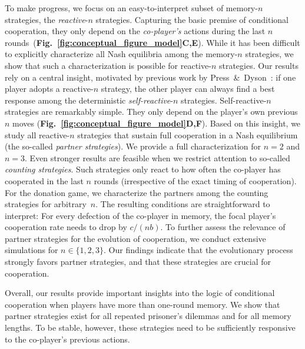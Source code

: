 \documentclass[9pt,twocolumn,twoside]{pnas-new}
\newcommand{\figref}[1]{{\textbf{Fig.~\ref{#1}}}}
\begin{document}
To make progress, we focus on an easy-to-interpret subset of memory-$n$ strategies, the {\it reactive}-$n$ strategies. 
Capturing the basic premise of conditional cooperation, they only depend on the {\it co-player's} actions during the last $n$ rounds~(\figref{fig:conceptual_figure_model}\textbf{C,E}). 
While it has been difficult to explicitly characterize all Nash equilibria among the memory-$n$ strategies, we show that such a characterization is possible for reactive-$n$ strategies. 
Our results rely on a central insight, motivated by previous work by Press~\&~Dyson~\citep{press:PNAS:2012}: 
if one player adopts a reactive-$n$ strategy, the other player can always find a best response among the deterministic {\it self-reactive}-$n$ strategies. 
Self-reactive-$n$ strategies are remarkably simple. 
They only depend on the player's own previous $n$ moves (\figref{fig:conceptual_figure_model}\textbf{D,F}).
Based on this insight, we study all reactive-$n$ strategies that sustain full cooperation in a Nash equilibrium (the so-called {\it partner strategies}). 
We provide a full characterization for $n\!=\!2$ and $n\!=\!3$.
Even stronger results are feasible when we restrict attention to so-called {\it counting strategies}.  
Such strategies only react to how often the co-player has cooperated in the last $n$ rounds (irrespective of the exact timing of cooperation). 
For the donation game, we characterize the partners among the counting strategies for arbitrary~$n$. 
The resulting conditions are straightforward to interpret:
For every defection of the co-player in memory, the focal player's cooperation rate needs to drop by $c/(nb)$.
To further assess the relevance of partner strategies for the evolution of cooperation, we conduct extensive simulations for $n\!\in\!\{1,2,3\}$. 
Our findings indicate that the evolutionary process strongly favors partner strategies, and that these strategies are crucial for cooperation. 

Overall, our results provide important insights into the logic of conditional cooperation when players have more than one-round memory. 
We show that partner strategies exist for all repeated prisoner's dilemmas and for all memory lengths. 
To be stable, however, these strategies need to be sufficiently responsive to the co-player's previous actions.
\end{document}
